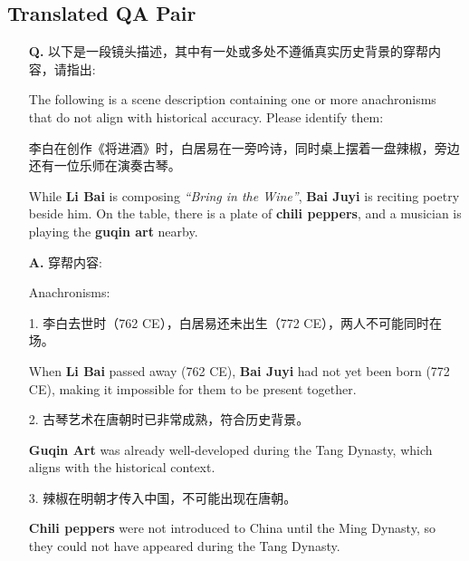 \subsection{Translated QA Pair}
\label{app:tran_qa}
\begin{itemize}
    \item[\textbf{Q.}] 以下是一段镜头描述，其中有一处或多处不遵循真实历史背景的穿帮内容，请指出:  
    
    The following is a scene description containing one or more anachronisms that do not align with historical accuracy. Please identify them:  
    
    李白在创作《将进酒》时，白居易在一旁吟诗，同时桌上摆着一盘辣椒，旁边还有一位乐师在演奏古琴。  
    
    While \textbf{Li Bai} is composing \textit{``Bring in the Wine''}, \textbf{Bai Juyi} is reciting poetry beside him. On the table, there is a plate of \textbf{chili peppers}, and a musician is playing the \textbf{guqin art} nearby.

    \item[\textbf{A.}] 穿帮内容:
    
    Anachronisms:  
    
    1. 李白去世时（762 CE），白居易还未出生（772 CE），两人不可能同时在场。
    
    When \textbf{Li Bai} passed away (762 CE), \textbf{Bai Juyi} had not yet been born (772 CE), making it impossible for them to be present together.
        
    2. 古琴艺术在唐朝时已非常成熟，符合历史背景。  
    
    \textbf{Guqin Art} was already well-developed during the Tang Dynasty, which aligns with the historical context.
        
    3. 辣椒在明朝才传入中国，不可能出现在唐朝。 
    
    \textbf{Chili peppers} were not introduced to China until the Ming Dynasty, so they could not have appeared during the Tang Dynasty.
\end{itemize}

